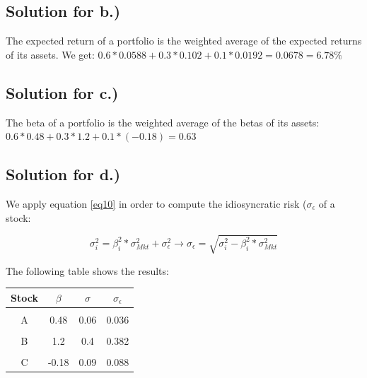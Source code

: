 \documentclass[a4paper,11pt,twoside]{article}
\begin{document}
\subsection{Solution for b.)}

The expected return of a portfolio is the weighted average of the expected returns of its assets. We get: $0.6*0.0588+0.3*0.102+0.1*0.0192 = 0.0678 = 6.78\% $

\subsection{Solution for c.)}

The beta of a portfolio is the weighted average of the betas of its assets:\\ $0.6*0.48 + 0.3*1.2 +0.1*(-0.18) = 0.63$

\subsection{Solution for d.)}

We apply equation \ref{eq10} in order to compute the idiosyncratic risk ($\sigma_\epsilon$ of a stock:

\begin{equation}
\label{eq10}
\sigma_i^2 = \beta_i^2*\sigma_{Mkt}^2+\sigma_\epsilon^2 \rightarrow \sigma_\epsilon = \sqrt{\sigma_i^2-\beta_i^2*\sigma_{Mkt}^2}
\end{equation}

The following table shows the results:

\begin{center} %
\begin{tabular} { c  c  c  c }
Stock & $\beta$ & $\sigma$ & $\sigma_\epsilon$ \\[5pt]
\hline \\[-5pt]
A & 0.48 & 0.06 & 0.036 \\[5pt]
\hline \\[-5pt]
B & 1.2 & 0.4 & 0.382\\[5pt]
\hline \\[-5pt]
C & -0.18 & 0.09 & 0.088 \\[5pt]
\hline
\end{tabular}
\end{center}
\end{document}
